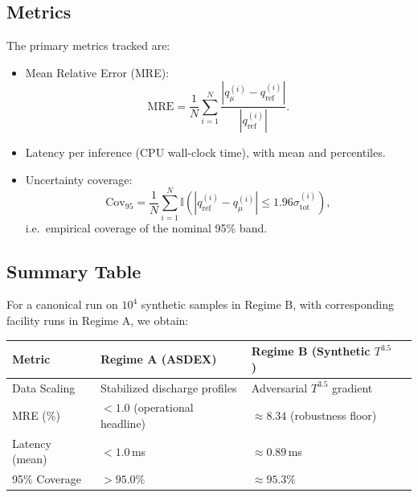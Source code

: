\documentclass[11pt]{article}
\begin{document}
\subsection{Metrics}

The primary metrics tracked are:

\begin{itemize}
  \item Mean Relative Error (MRE):
  \begin{equation}
    \mathrm{MRE} = \frac{1}{N}\sum_{i=1}^N \frac{\left|q_{\mu}^{(i)} - q_\mathrm{ref}^{(i)}\right|}{\left|q_\mathrm{ref}^{(i)}\right|}.
  \end{equation}

  \item Latency per inference (CPU wall-clock time), with mean and percentiles.

  \item Uncertainty coverage:
  \begin{equation}
    \mathrm{Cov}_{95} = \frac{1}{N}\sum_{i=1}^N \mathbb{I}\left( \left|q_\mathrm{ref}^{(i)} - q_\mu^{(i)}\right| \le 1.96 \sigma_{\mathrm{tot}}^{(i)} \right),
  \end{equation}
  i.e.\ empirical coverage of the nominal 95\% band.

\end{itemize}

\subsection{Summary Table}

For a canonical run on $10^4$ synthetic samples in Regime B, with corresponding facility runs in Regime A, we obtain:

\begin{center}
\begin{tabular}{@{}llll@{}}
\toprule
Metric       & Regime A (ASDEX) & Regime B (Synthetic $T^{3.5}$) \\
\midrule
Data Scaling & Stabilized discharge profiles & Adversarial $T^{3.5}$ gradient \\
MRE (\%)     & $< 1.0$ (operational headline) & $\approx 8.34$ (robustness floor) \\
Latency (mean) & $< 1.0$\,ms & $\approx 0.89$\,ms \\
95\% Coverage & $> 95.0\%$ & $\approx 95.3\%$ \\
\bottomrule
\end{tabular}
\end{center}
\end{document}
